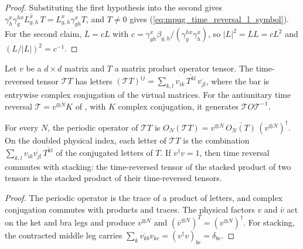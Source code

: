 \begin{proof}\leanok
    Substituting the first hypothesis into the second gives
    $\gamma^x_h\gamma^{h x}_g\overline{L^x_{g,h}}\,T
        =L^x_{g,h}\gamma^x_{gh}T$, and $T\neq0$ gives
    (\ref{eq:mpug_time_reversal_l_symbol}). For the second claim,
    $\overline L=cL$ with
    $c=\gamma^x_{gh}\beta_{g,h}/(\gamma^{h x}_g\gamma^x_h)$, so
    $|L|^2=\overline LL=cL^2$ and $(L/|L|)^2=c^{-1}$.
\end{proof}

\begin{definition}
    \label{def:mpug_time_reversed_tensor}
    \leanok
    Let $v$ be a $d\times d$ matrix and $T$ a matrix product operator tensor.
    The time-reversed tensor $\mathcal T T$ has letters
    $(\mathcal T T)^{ij}=\sum_{k,l}v_{ik}\,\overline{T^{kl}}\,\overline{v_{jl}}$,
    where the bar is entrywise complex conjugation of the virtual matrices.
    For the antiunitary time reversal $\mathcal T=v^{\otimes N}K$ of
    \cite[Section~4.3]{GarreRubio2023MPOSym}, with $K$ complex conjugation,
    it generates $\mathcal T O\mathcal T^{-1}$.
\end{definition}

\begin{lemma}
    \label{lem:mpug_time_reversed_tensor_properties}
    \leanok
    For every $N$, the periodic operator of $\mathcal T T$ is
    $O_N(\mathcal T T)=v^{\otimes N}\,\overline{O_N(T)}\,(v^{\otimes N})^\dagger$.
    On the doubled physical index, each letter of $\mathcal T T$ is the
    combination $\sum_{k,l}v_{ik}\overline{v_{jl}}\,\overline{T^{kl}}$ of the
    conjugated letters of $T$. If $v^\dagger v=1$, then time reversal
    commutes with stacking: the time-reversed tensor of the stacked product
    of two tensors is the stacked product of their time-reversed tensors.
\end{lemma}

\begin{proof}
    \leanok
    The periodic operator is the trace of a product of letters, and complex
    conjugation commutes with products and traces. The physical factors
    $v$ and $\overline v$ act on the ket and bra legs and produce
    $v^{\otimes N}$ and $(\overline v^{\otimes N})^T=(v^{\otimes N})^\dagger$.
    For stacking, the contracted middle leg carries
    $\sum_k\overline{v_{kb}}v_{kc}=(v^\dagger v)_{bc}=\delta_{bc}$.
\end{proof}

